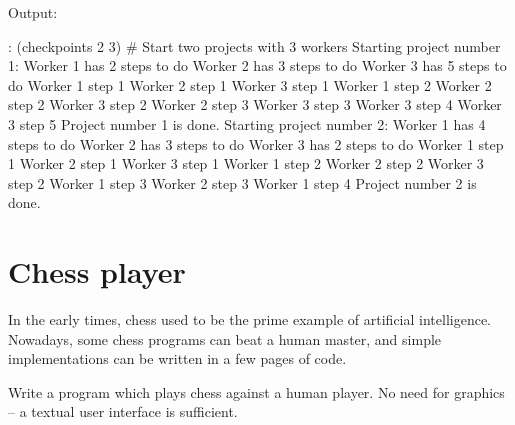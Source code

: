 \begin{wideverbatim}

Output:

: (checkpoints 2 3)  # Start two projects with 3 workers
Starting project number 1:
Worker 1 has 2 steps to do
Worker 2 has 3 steps to do
Worker 3 has 5 steps to do
Worker 1 step 1
Worker 2 step 1
Worker 3 step 1
Worker 1 step 2
Worker 2 step 2
Worker 3 step 2
Worker 2 step 3
Worker 3 step 3
Worker 3 step 4
Worker 3 step 5
Project number 1 is done.
Starting project number 2:
Worker 1 has 4 steps to do
Worker 2 has 3 steps to do
Worker 3 has 2 steps to do
Worker 1 step 1
Worker 2 step 1
Worker 3 step 1
Worker 1 step 2
Worker 2 step 2
Worker 3 step 2
Worker 1 step 3
Worker 2 step 3
Worker 1 step 4
Project number 2 is done.

\end{wideverbatim}

\pagebreak{}
\section*{Chess player}

In the early times, chess used to be the prime example of artificial
intelligence. Nowadays, some chess programs can beat a human master, and
simple implementations can be written in a few pages of code.

Write a program which plays chess against a human player. No need for
graphics -- a textual user interface is sufficient.

